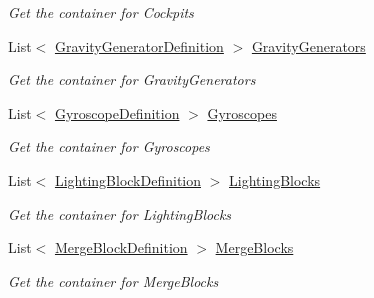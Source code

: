 \begin{DoxyCompactItemize}
\begin{DoxyCompactList}\small\item\em Get the container for Cockpits \end{DoxyCompactList}\item 
List$<$ \hyperlink{class_s_e_mod_a_p_i_1_1_a_p_i_1_1_definitions_1_1_cube_blocks_1_1_gravity_generator_definition}{Gravity\+Generator\+Definition} $>$ \hyperlink{class_s_e_mod_a_p_i_1_1_a_p_i_1_1_definitions_1_1_cube_blocks_1_1_blocks_manager_a9e9859ba905cee95abf2235a4474f6f7}{Gravity\+Generators}
\begin{DoxyCompactList}\small\item\em Get the container for Gravity\+Generators \end{DoxyCompactList}\item 
List$<$ \hyperlink{class_s_e_mod_a_p_i_1_1_a_p_i_1_1_definitions_1_1_cube_blocks_1_1_gyroscope_definition}{Gyroscope\+Definition} $>$ \hyperlink{class_s_e_mod_a_p_i_1_1_a_p_i_1_1_definitions_1_1_cube_blocks_1_1_blocks_manager_a4235abab99951689005dcd2ebff6ca3f}{Gyroscopes}
\begin{DoxyCompactList}\small\item\em Get the container for Gyroscopes \end{DoxyCompactList}\item 
List$<$ \hyperlink{class_s_e_mod_a_p_i_1_1_a_p_i_1_1_definitions_1_1_cube_blocks_1_1_lighting_block_definition}{Lighting\+Block\+Definition} $>$ \hyperlink{class_s_e_mod_a_p_i_1_1_a_p_i_1_1_definitions_1_1_cube_blocks_1_1_blocks_manager_a68bf9b0208c9a2aaca2f45cd7b0c60b1}{Lighting\+Blocks}
\begin{DoxyCompactList}\small\item\em Get the container for Lighting\+Blocks \end{DoxyCompactList}\item 
List$<$ \hyperlink{class_s_e_mod_a_p_i_1_1_a_p_i_1_1_definitions_1_1_cube_blocks_1_1_merge_block_definition}{Merge\+Block\+Definition} $>$ \hyperlink{class_s_e_mod_a_p_i_1_1_a_p_i_1_1_definitions_1_1_cube_blocks_1_1_blocks_manager_ace83e9ddd5a4587369db35eb7ab64451}{Merge\+Blocks}
\begin{DoxyCompactList}\small\item\em Get the container for Merge\+Blocks \end{DoxyCompactList}\item 

\end{DoxyCompactItemize}
